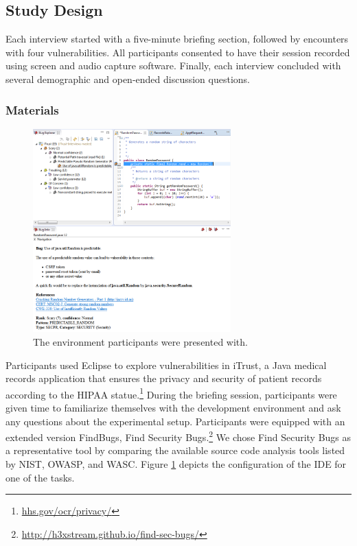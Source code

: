 \documentclass[conference]{IEEEtran}
\begin{document}
\subsection{Study Design}
\label{studyDesign}
Each interview started with a five-minute briefing section, followed by encounters with four vulnerabilities.
All participants consented to have their session recorded using screen and audio capture software.
Finally, each interview concluded with several demographic and open-ended discussion questions.


\subsubsection{Materials}

\begin{figure}
\centering
\includegraphics[width=3in]{Images/environment.png}
\caption{The environment participants were presented with.}
\label{fig:environment} 
\end{figure}
	

Participants used Eclipse to explore vulnerabilities in iTrust, a Java medical records application that ensures the privacy and security of patient records according to the HIPAA statue.\footnote{\url{hhs.gov/ocr/privacy/}} 
During the briefing session, participants were given time to familiarize themselves with the development environment and ask any questions about the experimental setup.
Participants were equipped with an extended version FindBugs, Find Security Bugs.\footnote{\url{http://h3xstream.github.io/find-sec-bugs/}} 
We chose Find Security Bugs as a representative tool by comparing the available source code analysis tools listed by NIST, OWASP, and WASC.
Figure \ref{fig:environment} depicts the configuration of the IDE for one of the tasks.
\end{document}
